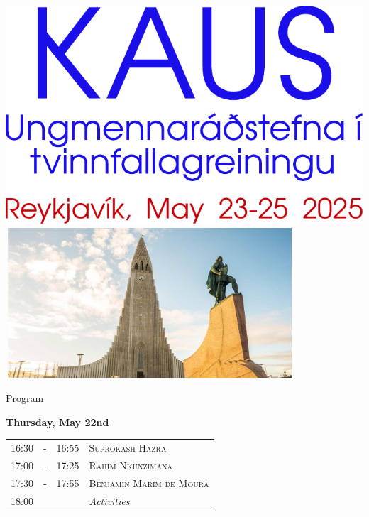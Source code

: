 \documentclass[12pt, openany, twoside]{report}      %
\begin{document}
\begin{titlepage}
    \centering
    \includegraphics[scale = 1.00]{figs/kaus-title} \\
    \vfill
    \vfill
    \vfill
    \includegraphics[width=0.8\textwidth]{figs/hallgrimskirkja}\par\vspace{1cm}
    \vfill
    \vfill
\end{titlepage}

\renewcommand{\arraystretch}{1.2}

\noindent
{\LARGE Program}

\bigskip
\bigskip
\noindent
\textbf{\large Thursday, May 22nd}
\smallskip

\noindent
\begin{tabular}{l@{ } l@{ } l l}
16:30 & - & 16:55 & \textsc{Suprokash Hazra}
\\
17:00 & - & 17:25 & \textsc{Rahim Nkunzimana}
\\
17:30 & - & 17:55 & \textsc{Benjamin Marim de Moura}
\\
18:00 &  &  & \textit{Activities}
\end{tabular}
\end{document}
